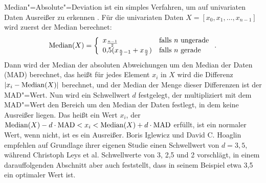 Median"=Absolute"=Deviation ist ein simples Verfahren, um auf univariaten Daten Ausreißer zu erkennen \cite[Ch. 3.3]{mad}. Für die univariaten Daten $X=[x_0,x_1,\ldots, x_{n-1}]$ wird zuerst der Median berechnet: \[\operatorname{Median}(X)=\left\{ \begin{array}{ll}
    x_{\frac{n-1}{2}} & \text{falls } n \text{ ungerade} \\
    0{,}5 (x_{\frac{n}{2}-1} + x_{\frac{n}{2}}) & \text{falls } n \text{ gerade} \\
\end{array} \right..\]
Dann wird der Median der absoluten Abweichungen um den Median der Daten (MAD) berechnet, das heißt für jedes Element $x_i$ in $X$ wird die Differenz $|x_i - \operatorname{Median}(X)|$ berechnet, und der Median der Menge dieser Differenzen ist der MAD"=Wert. Nun wird ein Schwellwert $d$ festgelegt, der multipliziert mit dem MAD"=Wert den Bereich um den Median der Daten festlegt, in dem keine Ausreißer liegen. Das heißt ein Wert $x_i$, der $\operatorname{Median}(X) - d \cdot \text{MAD} < x_i < \operatorname{Median}(X) + d \cdot \text{MAD}$ erfüllt, ist ein normaler Wert, wenn nicht, ist es ein Ausreißer. Boris Iglewicz und David C. Hoaglin \cite[Ch. 3.3]{mad} empfehlen auf Grundlage ihrer eigenen Studie einen Schwellwert von $d=3{,}5$, während Christoph Leys et al. \cite[p. 766]{mad2} Schwellwerte von 3, 2,5 und 2 vorschlägt, in einem darauffolgenden Abschnitt aber auch feststellt, dass in seinem Beispiel etwa 3,5 ein optimaler Wert ist.
